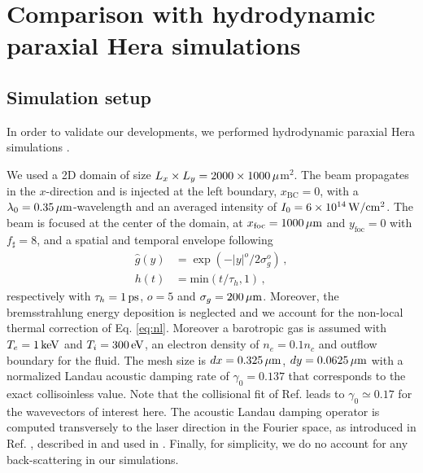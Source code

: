 \documentclass[
 reprint,
 amsmath,amssymb,
 aps,
]{revtex4-1}
\begin{document}
\section{Comparison with hydrodynamic paraxial Hera simulations}
\subsection{Simulation setup}
In order to validate our developments, we performed hydrodynamic  paraxial Hera simulations \cite[]{Loiseau_2006}.

We used a 2D domain of size $L_x \times L_y = 2000 \times 1000\, \rm \mu$m$^2$. 
The beam propagates in the $x$-direction and is injected at the left boundary, $x_\mathrm{BC}=0$, with a  $\lambda_0=0.35\, \rm\mu m$-wavelength and an averaged intensity of $I_0=6\times 10^{14}\, \rm W/cm^2$.
The beam is focused at the center of the domain, at 
$x_\mathrm{foc}=1000\, \rm \mu m$ and $y_\mathrm{foc}=0$ with  $f_\sharp = 8$, and
a spatial and temporal envelope following
\begin{align}
    \hat{g}(y) &= \exp(-\vert y\vert ^o/2\sigma_g^o)  \, ,  \label{eq:g}\\
    h(t) &= \mathrm{min}(t/\tau_h,1) \, ,\label{eq:h}
\end{align}
respectively with $\tau_h=1\, \rm ps$,  $o=5$ and $\sigma_g = 200\,\rm \mu m$.  
Moreover, the bremsstrahlung energy deposition is neglected and we account for the non-local thermal correction of Eq. \eqref{eq:nl}.  
Moreover a barotropic gas is assumed  with $T_e=1\,\rm keV$ and $T_i=300\,\rm eV$, an electron density of $n_e =0.1n_c $ and outflow boundary for the fluid.
The mesh size is $dx =0.325\,\rm \mu m$, $dy = 0.0625\, \rm \mu m$
with a normalized Landau acoustic damping rate of $\gamma_0=0.137$ that corresponds to the exact collisoinless value. Note that the  collisional fit of Ref. \cite[]{casanova_1989} leads to $\gamma_0\simeq0.17$ for the wavevectors of interest here. 
The acoustic Landau damping operator is computed transversely to the laser direction in the Fourier space, as introduced in Ref. \cite[]{POP_Rose_96}, described in \cite[]{Berger_98} and used in   \cite{phd-PEML,Masson_2006,Huller_2008}.
Finally, for simplicity, we do no account for any back-scattering in our  simulations. 
\end{document}
